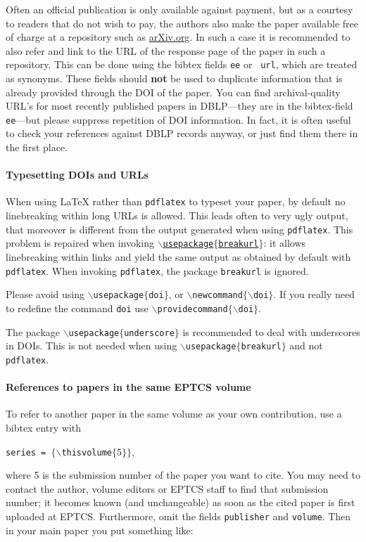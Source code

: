 \documentclass[submission,copyright,creativecommons]{eptcs}
\begin{document}
Often an official publication is only available against payment, but
as a courtesy to readers that do not wish to pay, the authors also
make the paper available free of charge at a repository such as
\url{arXiv.org}. In such a case it is recommended to also refer and
link to the URL of the response page of the paper in such a
repository.  This can be done using the bibtex fields {\tt ee} or {\tt
url}, which are treated as synonyms.  These fields should \textbf{not} be used
to duplicate information that is already provided through the DOI of
the paper.
You can find archival-quality URL's for most recently published papers
in DBLP---they are in the bibtex-field {\tt ee}---but please suppress
repetition of DOI information. In fact, it is often
useful to check your references against DBLP records anyway, or just find
them there in the first place.

\paragraph{Typesetting DOIs and URLs}

When using {\LaTeX} rather than {\tt pdflatex} to typeset your paper, by
default no linebreaking within long URLs is allowed. This leads often
to very ugly output, that moreover is different from the output
generated when using {\tt pdflatex}. This problem is repaired when
invoking \href{http://eptcs.web.cse.unsw.edu.au/breakurl.sty}
{\tt $\backslash$usepackage$\{$breakurl$\}$}: it allows linebreaking
within links and yield the same output as obtained by default with
{\tt pdflatex}. 
When invoking {\tt pdflatex}, the package {\tt breakurl} is ignored.

Please avoid using {\tt $\backslash$usepackage$\{$doi$\}$}, or
{\tt $\backslash$newcommand$\{\backslash$doi$\}$}.
If you really need to redefine the command {\tt doi}
use {\tt $\backslash$providecommand$\{\backslash$doi$\}$}.

The package {\tt $\backslash$usepackage$\{$underscore$\}$} is
recommended to deal with underscores in DOIs. This is not needed when
using {\tt $\backslash$usepackage$\{$breakurl$\}$} and not {\tt pdflatex}.

\paragraph{References to papers in the same EPTCS volume}

To refer to another paper in the same volume as your own contribution,
use a bibtex entry with
\begin{center}
  {\tt series    = $\{\backslash$thisvolume$\{5\}\}$},
\end{center}
where 5 is the submission number of the paper you want to cite.
You may need to contact the author, volume editors or EPTCS staff to
find that submission number; it becomes known (and unchangeable)
as soon as the cited paper is first uploaded at EPTCS\@.
Furthermore, omit the fields {\tt publisher} and {\tt volume}.
Then in your main paper you put something like:
\end{document}
